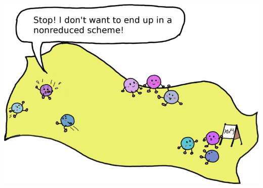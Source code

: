 \documentclass[entwurf]{uebblatt}
\begin{document}
\centering
\includegraphics{images/hilbert-scheme-of-points}
\end{document}
